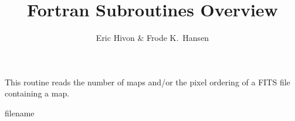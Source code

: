 
\sloppy


\title{\healpix Fortran Subroutines Overview}
 \section[getsize\_fits]{ }
\label{sub:getsize_fits}
\author{Eric Hivon \& Frode K.~Hansen}

\begin{facility}
{This routine reads the number of maps and/or the pixel ordering of a FITS file containing a \healpix map.}
{\modFitstools}
\end{facility}

\begin{f90function}
{filename }
\end{f90function}
\aboutoptional

